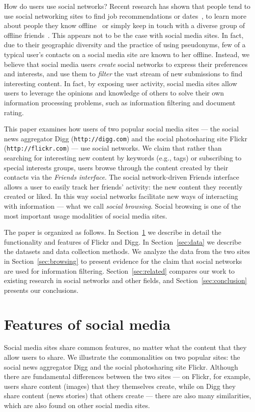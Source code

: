 \documentclass[]{article}
\newcommand{\secref}[1]{Section~\ref{#1}}
\begin{document}
How do users use social networks?
Recent research has shown that people tend to use social networking
sites to find job recommendations or dates~\cite{boyd04}, to learn
more about people they know offline~\cite{lampe06} or simply keep in
touch with a diverse group of offline friends~\cite{PewInternet,ambient-intimacy}.
This appears not to be the case with social media sites. In fact, due to their geographic
diversity and the practice of using pseudonyms,
few of a typical user's contacts on a social media site are
known to her offline. Instead, we believe that social media users
\emph{create} social networks to express their preferences and interests,
and use them to \emph{filter} the vast stream of new
submissions to find interesting content.
In fact, by exposing user
activity, social media sites allow users to leverage the opinions
and knowledge of others to solve their own information processing
problems, such as information filtering and document rating.



This paper examines how users of two popular social media
sites --- the social news aggregator Digg (\texttt{http://digg.com})
and the social photosharing site
Flickr (\texttt{http://flickr.com}) --- use social networks.
We claim that rather than
searching for interesting new content by keywords (e.g., tags) or subscribing to special
interests groups, users browse through the content created by
their contacts via the \emph{Friends interface}.
The social  network-driven Friends interface allows a user to easily
track her friends' activity: the new content they recently created
or liked. In this way social networks facilitate new ways of interacting
with information --- what we call \emph{social browsing}. Social
browsing is one of the most important usage modalities of social
media sites.


The paper is organized as follows. In \secref{sec:anatomy} we
describe in detail the functionality and features of Flickr and
Digg. In \secref{sec:data} we describe the datasets and data collection
methods. We analyze the data from the two sites in
\secref{sec:browsing} to present evidence for the claim that social
networks are used for information filtering. \secref{sec:related}
compares our work to existing research in social networks and other
fields, and \secref{sec:conclusion} presents our conclusions.




\section{Features of social media}
\label{sec:anatomy}
Social media sites share common features, no matter what the content
that they allow users to share. We illustrate the commonalities on
two popular sites: the social news aggregator Digg and the social
photosharing site Flickr. Although there are fundamental differences
between the two sites --- on Flickr, for example, users share
content (images) that they themselves create, while on Digg they
share content (news stories) that others create --- there are also
many similarities, which are also found on other social media sites.
\end{document}
